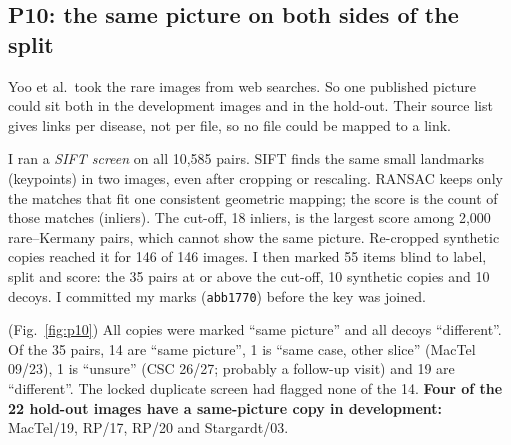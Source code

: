 \documentclass[10pt,a4paper]{article}
\newcommand{\hash}[1]{\texttt{\footnotesize #1}}
\newenvironment{parts}{\begin{description}[style=unboxed, leftmargin=0pt, itemsep=3pt, font=\normalfont\bfseries\itshape]}{\end{description}}
\newenvironment{topic}[2]{\subsection{#1}\label{#2}\begin{parts}}{\end{parts}}
\begin{document}
\begin{topic}{P10: the same picture on both sides of the split}{sec:p10}
\item[The problem.] Yoo et al.\ took the rare images from web searches. So one published picture could sit both
in the development images and in the hold-out. Their source list gives links per disease, not per file, so no
file could be mapped to a link.
\item[What I changed.] I ran a \emph{SIFT screen} on all 10,585 pairs. SIFT finds the same small landmarks
(keypoints) in two images, even after cropping or rescaling. RANSAC keeps only the matches that fit one
consistent geometric mapping; the score is the count of those matches (inliers). The cut-off, 18 inliers, is the
largest score among 2,000 rare--Kermany pairs, which cannot show the same picture. Re-cropped synthetic copies
reached it for 146 of 146 images. I then marked 55 items blind to label, split and score: the 35 pairs at or
above the cut-off, 10 synthetic copies and 10 decoys. I committed my marks (\hash{abb1770}) before the key was
joined.
\item[Result.] (Fig.~\ref{fig:p10}) All copies were marked ``same picture'' and all decoys ``different''. Of the 35
pairs, 14 are ``same picture'', 1 is ``same case, other slice'' (MacTel 09/23), 1 is ``unsure'' (CSC 26/27;
probably a follow-up visit) and 19 are ``different''. The locked duplicate screen had flagged none of the 14.
\textbf{Four of the 22 hold-out images have a same-picture copy in development:} MacTel/19, RP/17, RP/20 and
Stargardt/03.

\smallskip
{}


\end{topic}
\end{document}
